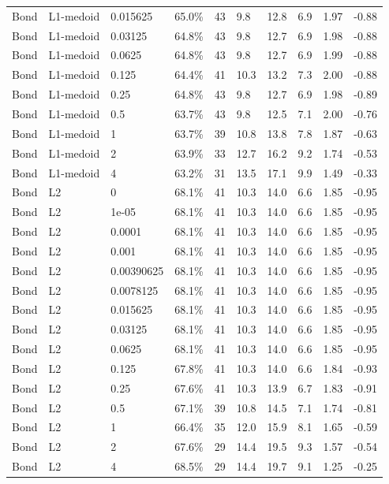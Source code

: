 \begin{table}[!htbp]
\begin{tabular}{llllllllll}
Bond & L1-medoid & 0.015625 & 65.0\% & 43 & 9.8 & 12.8 & 6.9 & 1.97 & -0.88 \\
Bond & L1-medoid & 0.03125 & 64.8\% & 43 & 9.8 & 12.7 & 6.9 & 1.98 & -0.88 \\
Bond & L1-medoid & 0.0625 & 64.8\% & 43 & 9.8 & 12.7 & 6.9 & 1.99 & -0.88 \\
Bond & L1-medoid & 0.125 & 64.4\% & 41 & 10.3 & 13.2 & 7.3 & 2.00 & -0.88 \\
Bond & L1-medoid & 0.25 & 64.8\% & 43 & 9.8 & 12.7 & 6.9 & 1.98 & -0.89 \\
Bond & L1-medoid & 0.5 & 63.7\% & 43 & 9.8 & 12.5 & 7.1 & 2.00 & -0.76 \\
Bond & L1-medoid & 1 & 63.7\% & 39 & 10.8 & 13.8 & 7.8 & 1.87 & -0.63 \\
Bond & L1-medoid & 2 & 63.9\% & 33 & 12.7 & 16.2 & 9.2 & 1.74 & -0.53 \\
Bond & L1-medoid & 4 & 63.2\% & 31 & 13.5 & 17.1 & 9.9 & 1.49 & -0.33 \\
Bond & L2 & 0 & 68.1\% & 41 & 10.3 & 14.0 & 6.6 & 1.85 & -0.95 \\
Bond & L2 & 1e-05 & 68.1\% & 41 & 10.3 & 14.0 & 6.6 & 1.85 & -0.95 \\
Bond & L2 & 0.0001 & 68.1\% & 41 & 10.3 & 14.0 & 6.6 & 1.85 & -0.95 \\
Bond & L2 & 0.001 & 68.1\% & 41 & 10.3 & 14.0 & 6.6 & 1.85 & -0.95 \\
Bond & L2 & 0.00390625 & 68.1\% & 41 & 10.3 & 14.0 & 6.6 & 1.85 & -0.95 \\
Bond & L2 & 0.0078125 & 68.1\% & 41 & 10.3 & 14.0 & 6.6 & 1.85 & -0.95 \\
Bond & L2 & 0.015625 & 68.1\% & 41 & 10.3 & 14.0 & 6.6 & 1.85 & -0.95 \\
Bond & L2 & 0.03125 & 68.1\% & 41 & 10.3 & 14.0 & 6.6 & 1.85 & -0.95 \\
Bond & L2 & 0.0625 & 68.1\% & 41 & 10.3 & 14.0 & 6.6 & 1.85 & -0.95 \\
Bond & L2 & 0.125 & 67.8\% & 41 & 10.3 & 14.0 & 6.6 & 1.84 & -0.93 \\
Bond & L2 & 0.25 & 67.6\% & 41 & 10.3 & 13.9 & 6.7 & 1.83 & -0.91 \\
Bond & L2 & 0.5 & 67.1\% & 39 & 10.8 & 14.5 & 7.1 & 1.74 & -0.81 \\
Bond & L2 & 1 & 66.4\% & 35 & 12.0 & 15.9 & 8.1 & 1.65 & -0.59 \\
Bond & L2 & 2 & 67.6\% & 29 & 14.4 & 19.5 & 9.3 & 1.57 & -0.54 \\
Bond & L2 & 4 & 68.5\% & 29 & 14.4 & 19.7 & 9.1 & 1.25 & -0.25 \\
\bottomrule
\end{tabular}
\end{table}